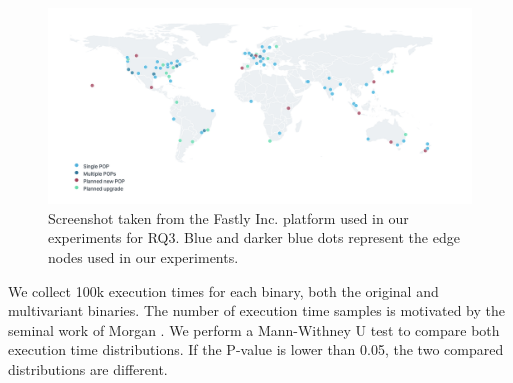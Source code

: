 \begin{figure}[h]
    \centering
    \includegraphics[width=\linewidth]{diagrams/pops.png}
    \caption{Screenshot taken from the Fastly Inc. platform used in our experiments for RQ3. Blue and darker blue dots represent the edge nodes used in our experiments.}
    \label{diagrams:protocol:rq3:map}
\end{figure}



We collect 100k execution times for each binary, both the original and multivariant binaries. The number of execution time samples is motivated by the seminal work of Morgan \etal \cite{morgan2015web}. 
We perform a Mann-Withney U test \cite{mann1947} to compare both execution time distributions. 
If the P-value is lower than 0.05, the two compared distributions are different.